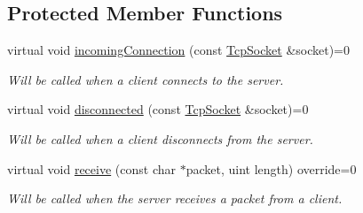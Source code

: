 \subsection*{Protected Member Functions}
\begin{DoxyCompactItemize}
\item 
virtual void \mbox{\hyperlink{class_tcp_server_ad1e57837a4b59e4c1b48871bb079ebb5}{incoming\+Connection}} (const \mbox{\hyperlink{class_tcp_socket}{Tcp\+Socket}} \&socket)=0
\begin{DoxyCompactList}\small\item\em Will be called when a client connects to the server. \end{DoxyCompactList}\item 
virtual void \mbox{\hyperlink{class_tcp_server_aa46b3b62f38d3ff8c6ad122e6201c094}{disconnected}} (const \mbox{\hyperlink{class_tcp_socket}{Tcp\+Socket}} \&socket)=0
\begin{DoxyCompactList}\small\item\em Will be called when a client disconnects from the server. \end{DoxyCompactList}\item 
virtual void \mbox{\hyperlink{class_tcp_server_a4a506d4903c2a5ef92ed1ef5542fdedb}{receive}} (const char $\ast$packet, uint length) override=0
\begin{DoxyCompactList}\small\item\em Will be called when the server receives a packet from a client. \end{DoxyCompactList}\end{DoxyCompactItemize}
